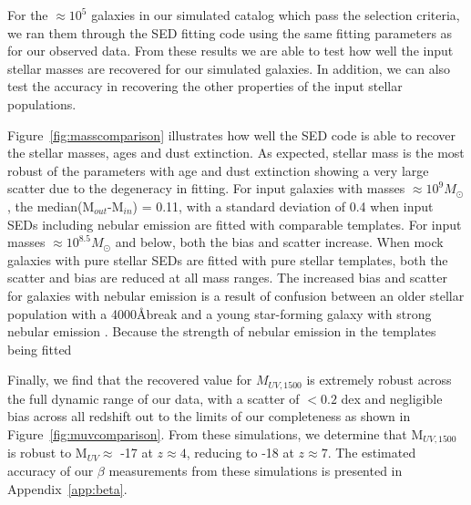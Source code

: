 For the $\approx 10^5$ galaxies in our simulated catalog which pass the selection criteria, we ran them through the SED fitting code using the same fitting parameters as for our observed data. From these results we are able to test how well the input stellar masses are recovered for our simulated galaxies. In addition, we can also test the accuracy in recovering the other properties of the input stellar populations.

Figure~\ref{fig:masscomparison} illustrates how well the SED code is able to recover the stellar masses, ages and dust extinction. As expected, stellar mass is the most robust of the parameters with age and dust extinction showing a very large scatter due to the degeneracy in fitting.
For input galaxies with masses $\approx 10^9 M_{\odot}$, the median(M$_{out}$-M$_{in}$) = 0.11, with a standard deviation of 0.4 when input SEDs including nebular emission are fitted with comparable templates. For input masses $\approx 10^{8.5} M_{\odot}$ and below, both the bias and scatter increase.
When mock galaxies with pure stellar SEDs are fitted with pure stellar templates, both the scatter and bias are reduced at all mass ranges. The increased bias and scatter for galaxies with nebular emission is a result of confusion between an older stellar population with a 4000\AA break and a young star-forming galaxy with strong nebular emission \citep{2009A&A...502..423S,2013MNRAS.429..302C}. Because the strength of nebular emission in the templates being fitted 


\begin{figure*}
\caption{2D histograms showing the recovered SED parameters for a set of input SEDs incorporating nebular emission when fitted with nebular emission. The values for the age (centre) and dust (right) are those corresponding to the single best-fitting model whilst the measured mass (left) is taken as $\int M P(M)dM$. Each histogram is normalised by the number of input galaxies in each bin and the colour scale corresponds to the fraction of input galaxies at the observed mass (/age/dust extinction) i.e. darker = more galaxies.}
\label{fig:masscomparison}
\end{figure*}

Finally, we find that the recovered value for $M_{UV,1500}$ is extremely robust across the full dynamic range of our data, with a scatter of $< 0.2$ dex and negligible bias across all redshift out to the limits of our completeness as shown in Figure~\ref{fig:muvcomparison}. From these simulations, we determine that M$_{UV,1500}$ is robust to M$_{UV} \approx$ -17 at $z \approx 4$, reducing to -18 at $z \approx 7$. The estimated accuracy of our $\beta$ measurements from these simulations is presented in Appendix~\ref{app:beta}.

